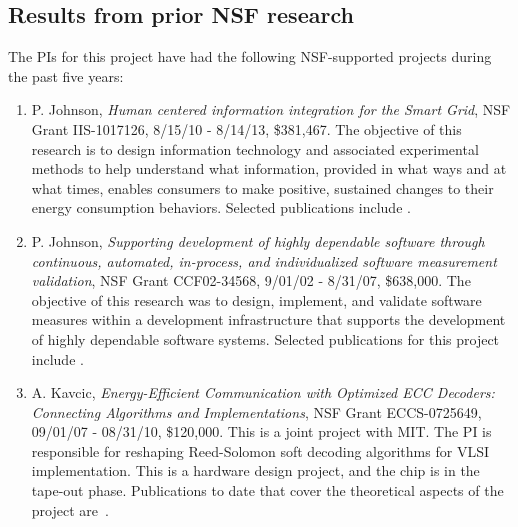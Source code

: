 
\subsection{Results from prior NSF research}

The PIs for this project have had the following NSF-supported projects during the past five years:

\begin{enumerate}
\item P. Johnson, {\em Human centered information integration for the Smart Grid}, NSF
  Grant IIS-1017126, 8/15/10 - 8/14/13, \$381,467. The objective of this
  research is to design information technology and associated experimental
  methods to help understand what information, provided in what ways and at
  what times, enables consumers to make positive, sustained changes to
  their energy consumption behaviors. Selected publications include
  \cite{csdl2-10-05,csdl2-10-07,csdl2-11-02,csdl2-11-03,csdl2-11-07}.


\item P. Johnson, {\em Supporting development of highly dependable software through
    continuous, automated, in-process, and individualized software
    measurement validation}, NSF Grant CCF02-34568, 9/01/02 - 8/31/07,
  \$638,000.  The objective of this research was to design, implement, and
  validate software measures within a development infrastructure that
  supports the development of highly dependable software systems.  Selected
  publications for this project include
  \cite{csdl2-04-22,csdl2-04-13,csdl2-04-11,csdl2-03-12,csdl2-02-07,csdl2-03-07,csdl2-04-02,csdl2-04-04,csdl2-04-11,csdl2-06-07,csdl2-06-08,csdl2-06-13,csdl2-06-06,csdl2-09-01}.

\item A. Kavcic, {\em Energy-Efficient Communication with Optimized ECC Decoders:
    Connecting Algorithms and Implementations}, NSF Grant ECCS-0725649, 09/01/07 -
  08/31/10, \$120,000. This is a joint project with MIT. The PI is
  responsible for reshaping Reed-Solomon soft decoding algorithms for VLSI
  implementation. This is a hardware design project, and the chip is in the
  tape-out phase. Publications to date that cover the theoretical aspects
  of the project
  are~\cite{Bellorado10a,Bellorado10b,Lim08,Lim08a,Lim10,Lim10a}.



\end{enumerate}
